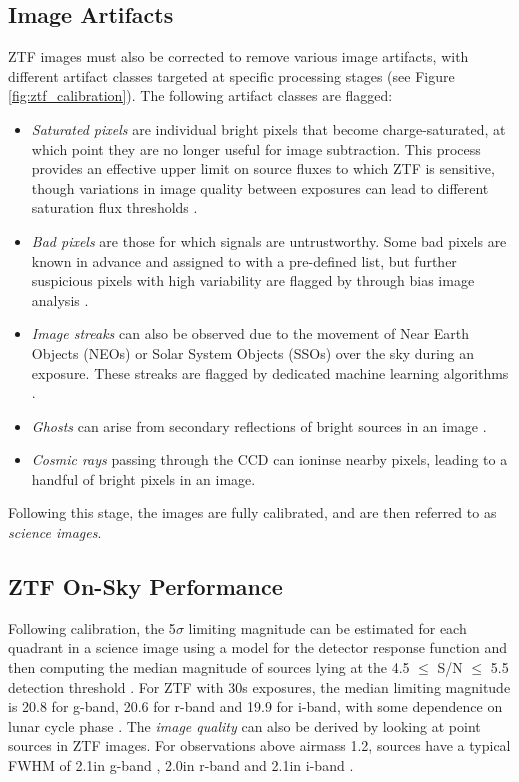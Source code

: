 \subsection*{Image Artifacts}

ZTF images must also be corrected to remove various image artifacts, with different artifact classes targeted at specific processing stages (see Figure \ref{fig:ztf_calibration}). The following artifact classes are flagged:

\begin{itemize}
	\item\emph{Saturated pixels} are individual bright pixels that become charge-saturated, at which point they are no longer useful for image subtraction. This process provides an effective upper limit on source fluxes to which ZTF is sensitive, though variations in image quality between exposures can lead to different saturation flux thresholds \cite{ztf_data_processing}.
	\item \emph{Bad pixels} are those for which signals are untrustworthy. Some bad pixels are known in advance and assigned to with a pre-defined list, but further suspicious pixels with high variability are flagged by through bias image analysis \cite{ztf_data_processing}. 
	\item \emph{Image streaks} can also be observed due to the movement of Near Earth Objects (NEOs) or Solar System Objects (SSOs) over the sky during an exposure. These streaks are flagged by dedicated machine learning algorithms  .
	\item \emph{Ghosts} can arise from secondary reflections of bright sources in an image .
	\item \emph{Cosmic rays} passing through the CCD can ioninse nearby pixels, leading to a handful of bright pixels in an image.
\end{itemize}

Following this stage, the images are fully calibrated, and are then referred to as \emph{science images}. 

\subsection*{ZTF On-Sky Performance}

Following calibration, the 5$\sigma$ limiting magnitude can be estimated for each quadrant in a science image using a model for the detector response function and then computing the median magnitude of sources lying at the 4.5 $\leq$ S/N $\leq$ 5.5 detection threshold \cite{ztf_data_processing}. For ZTF with 30s exposures, the median limiting magnitude is 20.8 for g-band, 20.6 for r-band and 19.9 for i-band, with some dependence on lunar cycle phase \cite{ztf_system}. The \emph{image quality} can also be derived by looking at point sources in ZTF images. For observations above airmass 1.2, sources have a typical FWHM of 2.1\arcsec in g-band , 2.0\arcsec in r-band and 2.1\arcsec in i-band \cite{ztf_system}.


